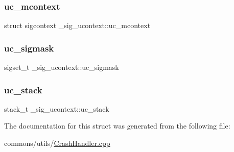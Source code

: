 \mbox{\label{struct__sig__ucontext_a492ac4ba6ac49238b3f0f1bed8b91e85}} 
\subsubsection{\texorpdfstring{uc\_mcontext}{uc\_mcontext}}
{\footnotesize\ttfamily struct sigcontext \+\_\+sig\+\_\+ucontext\+::uc\+\_\+mcontext}

\mbox{\label{struct__sig__ucontext_a64c81fb3959d146193d118c9ef90ab4f}} 
\subsubsection{\texorpdfstring{uc\_sigmask}{uc\_sigmask}}
{\footnotesize\ttfamily sigset\+\_\+t \+\_\+sig\+\_\+ucontext\+::uc\+\_\+sigmask}

\mbox{\label{struct__sig__ucontext_a60deb0ea689dc0a44d0c5065645427c8}} 
\subsubsection{\texorpdfstring{uc\_stack}{uc\_stack}}
{\footnotesize\ttfamily stack\+\_\+t \+\_\+sig\+\_\+ucontext\+::uc\+\_\+stack}



The documentation for this struct was generated from the following file\+:\begin{DoxyCompactItemize}
\item 
commons/utils/\mbox{\hyperlink{_crash_handler_8cpp}{Crash\+Handler.\+cpp}}\end{DoxyCompactItemize}

